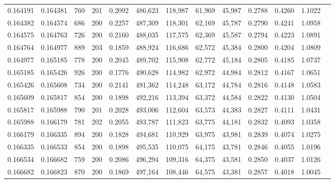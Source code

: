 \begin{tabular}{rrrrrrrrrrrrr}
0.164191 & 0.164381 &   760 & 201 &                                     0.2092 & 486,623 & 118,987 &  61,969 &  45,987 & 0.2788 & 0.4260 & 1.1022 \\
0.164382 & 0.164574 &   686 & 200 &                                     0.2257 & 487,309 & 118,301 &  62,169 &  45,787 & 0.2790 & 0.4241 & 1.0958 \\
0.164575 & 0.164763 &   726 & 200 &                                     0.2160 & 488,035 & 117,575 &  62,369 &  45,587 & 0.2794 & 0.4223 & 1.0891 \\
0.164764 & 0.164977 &   889 & 203 &                                     0.1859 & 488,924 & 116,686 &  62,572 &  45,384 & 0.2800 & 0.4204 & 1.0809 \\
0.164977 & 0.165185 &   778 & 200 &                                     0.2045 & 489,702 & 115,908 &  62,772 &  45,184 & 0.2805 & 0.4185 & 1.0737 \\
0.165185 & 0.165426 &   926 & 200 &                                     0.1776 & 490,628 & 114,982 &  62,972 &  44,984 & 0.2812 & 0.4167 & 1.0651 \\
0.165426 & 0.165608 &   734 & 200 &                                     0.2141 & 491,362 & 114,248 &  63,172 &  44,784 & 0.2816 & 0.4148 & 1.0583 \\
0.165609 & 0.165817 &   854 & 200 &                                     0.1898 & 492,216 & 113,394 &  63,372 &  44,584 & 0.2822 & 0.4130 & 1.0504 \\
0.165817 & 0.165988 &   790 & 201 &                                     0.2028 & 493,006 & 112,604 &  63,573 &  44,383 & 0.2827 & 0.4111 & 1.0431 \\
0.165988 & 0.166179 &   781 & 202 &                                     0.2055 & 493,787 & 111,823 &  63,775 &  44,181 & 0.2832 & 0.4093 & 1.0358 \\
0.166179 & 0.166335 &   894 & 200 &                                     0.1828 & 494,681 & 110,929 &  63,975 &  43,981 & 0.2839 & 0.4074 & 1.0275 \\
0.166335 & 0.166533 &   854 & 200 &                                     0.1898 & 495,535 & 110,075 &  64,175 &  43,781 & 0.2846 & 0.4055 & 1.0196 \\
0.166534 & 0.166682 &   759 & 200 &                                     0.2086 & 496,294 & 109,316 &  64,375 &  43,581 & 0.2850 & 0.4037 & 1.0126 \\
0.166682 & 0.166823 &   870 & 200 &                                     0.1869 & 497,164 & 108,446 &  64,575 &  43,381 & 0.2857 & 0.4018 & 1.0045 \\

\end{tabular}
